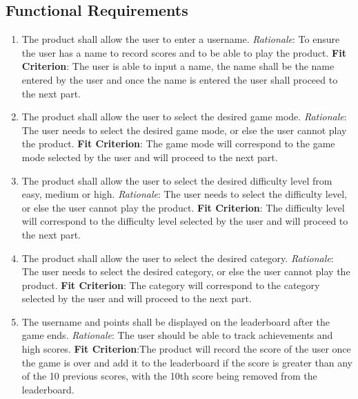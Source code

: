 \documentclass[12pt, titlepage]{article}
\begin{document}
\clearpage

\subsection{Functional Requirements}

\begin{enumerate}[{FR}1.]
	\item The product shall allow the user to enter a username.
	{\newline \emph{Rationale}:  To ensure the user has a name to record scores and to be able to play the product. 
	\newline \textbf{Fit Criterion}: The user is able to input a name, the name shall be the name entered by the user and once the name is entered the user shall proceed to the next part.} 
	
	\item The product shall allow the user to select the desired game mode.
	{\newline \emph{Rationale}:  The user needs to select the desired game mode, or else the user cannot play the product.
	\newline \textbf{Fit Criterion}: The game mode will correspond to the game mode selected by the user and will proceed to the next part.}
	
	\item The product shall allow the user to select the desired difficulty level from easy, medium or high.
	{\newline \emph{Rationale}:  The user needs to select the difficulty level, or else the user cannot play the product.
	\newline \textbf{Fit Criterion}: The difficulty level will correspond to the difficulty level selected by the user and will proceed to the next part.}
	
	\item The product shall allow the user to select the desired category.
	{\newline \emph{Rationale}:  The user needs to select the desired category, or else the user cannot play the product.
	\newline \textbf{Fit Criterion}: The category will correspond to the category selected by the user and will proceed to the next part.}
	
	\item The username and points shall be displayed on the leaderboard after the game ends.
	{\newline \emph{Rationale}: The user should be able to track achievements and high scores.
	\newline \textbf{Fit Criterion}:The product will record the score of the user once the game is over and add it to the leaderboard if the score is greater than any of the 10 previous scores, with the 10th score being removed from the leaderboard.}
	

\end{enumerate}
\end{document}
